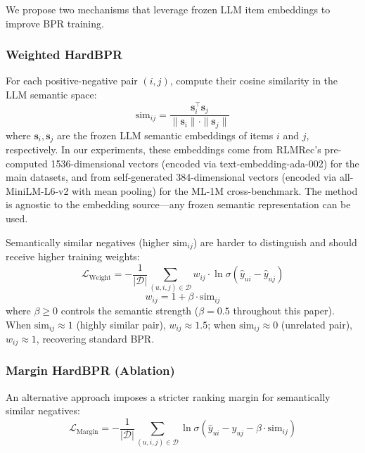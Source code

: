 \documentclass[11pt,a4paper]{article}
\begin{document}
We propose two mechanisms that leverage frozen LLM item embeddings to improve BPR training.

\subsubsection{Weighted HardBPR}

For each positive-negative pair $(i,j)$, compute their cosine similarity in the LLM semantic space:
\begin{equation}
    \text{sim}_{ij} = \frac{\mathbf{s}_i^{\top} \mathbf{s}_j}{\|\mathbf{s}_i\| \cdot \|\mathbf{s}_j\|}
\end{equation}
where $\mathbf{s}_i, \mathbf{s}_j$ are the frozen LLM semantic embeddings of items $i$ and $j$, respectively. In our experiments, these embeddings come from RLMRec's pre-computed 1536-dimensional vectors (encoded via text-embedding-ada-002) for the main datasets, and from self-generated 384-dimensional vectors (encoded via all-MiniLM-L6-v2 with mean pooling) for the ML-1M cross-benchmark. The method is agnostic to the embedding source---any frozen semantic representation can be used.

Semantically similar negatives (higher $\text{sim}_{ij}$) are harder to distinguish and should receive higher training weights:
\begin{equation}
    \mathcal{L}_{\text{Weight}} = -\frac{1}{|\mathcal{D}|} \sum_{(u,i,j) \in \mathcal{D}} w_{ij} \cdot \ln \sigma(\hat{y}_{ui} - \hat{y}_{uj})
\end{equation}
\begin{equation}
    w_{ij} = 1 + \beta \cdot \text{sim}_{ij}
\end{equation}
where $\beta \geq 0$ controls the semantic strength ($\beta = 0.5$ throughout this paper). When $\text{sim}_{ij} \approx 1$ (highly similar pair), $w_{ij} \approx 1.5$; when $\text{sim}_{ij} \approx 0$ (unrelated pair), $w_{ij} \approx 1$, recovering standard BPR.

\subsubsection{Margin HardBPR (Ablation)}

An alternative approach imposes a stricter ranking margin for semantically similar negatives:
\begin{equation}
    \mathcal{L}_{\text{Margin}} = -\frac{1}{|\mathcal{D}|} \sum_{(u,i,j) \in \mathcal{D}} \ln \sigma(\hat{y}_{ui} - \hat{y}_{uj} - \beta \cdot \text{sim}_{ij})
\end{equation}
\end{document}
